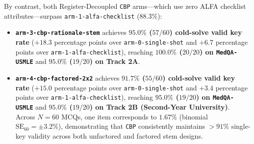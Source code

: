 \documentclass[11pt,a4paper]{article}
\begin{document}
By contrast, both Register-Decoupled \texttt{CBP} arms---which use zero ALFA checklist attributes---surpass \texttt{arm-1-alfa-checklist} ($88.3\%$):
\begin{itemize}
  \item \textbf{\texttt{arm-3-cbp-rationale-stem}} achieves \textbf{$95.0\%$ ($57/60$) cold-solve valid key rate} ($+18.3$ percentage points over \texttt{arm-0-single-shot} and $+6.7$ percentage points over \texttt{arm-1-alfa-checklist}), reaching \textbf{$100.0\%$ ($20/20$) on \texttt{MedQA-USMLE}} and \textbf{$95.0\%$ ($19/20$) on Track 2A}.
  \item \textbf{\texttt{arm-4-cbp-factored-2x2}} achieves \textbf{$91.7\%$ ($55/60$) cold-solve valid key rate} ($+15.0$ percentage points over \texttt{arm-0-single-shot} and $+3.4$ percentage points over \texttt{arm-1-alfa-checklist}), reaching \textbf{$95.0\%$ ($19/20$) on \texttt{MedQA-USMLE}} and \textbf{$95.0\%$ ($19/20$) on Track 2B (Second-Year University)}. Across $N=60$ MCQs, one item corresponds to $1.67\%$ (binomial $\text{SE}_{60} = \pm 3.2\%$), demonstrating that \texttt{CBP} consistently maintains $>91\%$ single-key validity across both unfactored and factored stem designs.
\end{itemize}
\end{document}

